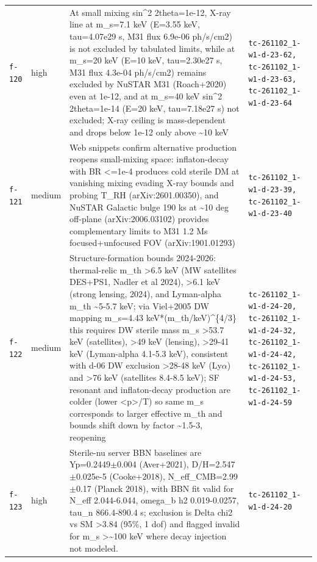 \documentclass[11pt,a4paper]{article}
\begin{document}
\begin{longtable}{@{}p{}p{}p{}p{}@{}}
\texttt{f-120} & high & At small mixing sin\textasciicircum{}2 2theta=1e-12, X-ray line at m\_s=7.1 keV (E=3.55 keV, tau=4.07e29 s, M31 flux 6.9e-06 ph/s/cm2) is not excluded by tabulated limits, while at m\_s=20 keV (E=10 keV, tau=2.30e27 s, M31 flux 4.3e-04 ph/s/cm2) remains excluded by NuSTAR M31 (Roach+2020) even at 1e-12, and at m\_s=40 keV sin\textasciicircum{}2 2theta=1e-14 (E=20 keV, tau=7.18e27 s) not excluded; X-ray ceiling is mass-dependent and drops below 1e-12 only above \textasciitilde{}10 keV & \texttt{tc-261102\_\allowbreak{}1-w1-d-23-62,\allowbreak{} tc-261102\_\allowbreak{}1-w1-d-23-63,\allowbreak{} tc-261102\_\allowbreak{}1-w1-d-23-64} \\
\texttt{f-121} & medium & Web snippets confirm alternative production reopens small-mixing space: inflaton-decay with BR \textless{}=1e-4 produces cold sterile DM at vanishing mixing evading X-ray bounds and probing T\_RH (arXiv:2601.00350), and NuSTAR Galactic bulge 190 ks at \textasciitilde{}10 deg off-plane (arXiv:2006.03102) provides complementary limits to M31 1.2 Ms focused+unfocused FOV (arXiv:1901.01293) & \texttt{tc-261102\_\allowbreak{}1-w1-d-23-39,\allowbreak{} tc-261102\_\allowbreak{}1-w1-d-23-40} \\
\texttt{f-122} & medium & Structure-formation bounds 2024-2026: thermal-relic m\_th \textgreater{}6.5 keV (MW satellites DES+PS1, Nadler et al 2024), \textgreater{}6.1 keV (strong lensing, 2024), and Lyman-alpha m\_th \textasciitilde{}5-5.7 keV; via Viel+2005 DW mapping m\_s=4.43 keV*(m\_th/keV)\textasciicircum{}\{4/3\} this requires DW sterile mass m\_s \textgreater{}53.7 keV (satellites), \textgreater{}49 keV (lensing), \textgreater{}29-41 keV (Lyman-alpha 4.1-5.3 keV), consistent with d-06 DW exclusion \textgreater{}28-48 keV (Ly$\alpha$) and \textgreater{}76 keV (satellites 8.4-8.5 keV); SF resonant and inflaton-decay production are colder (lower \textless{}p\textgreater{}/T) so same m\_s corresponds to larger effective m\_th and bounds shift down by factor \textasciitilde{}1.5-3, reopening & \texttt{tc-261102\_\allowbreak{}1-w1-d-24-20,\allowbreak{} tc-261102\_\allowbreak{}1-w1-d-24-32,\allowbreak{} tc-261102\_\allowbreak{}1-w1-d-24-42,\allowbreak{} tc-261102\_\allowbreak{}1-w1-d-24-53,\allowbreak{} tc-261102\_\allowbreak{}1-w1-d-24-59} \\
\texttt{f-123} & high & Sterile-nu server BBN baselines are Yp=0.2449$\pm$0.004 (Aver+2021), D/H=2.547$\pm$0.025e-5 (Cooke+2018), N\_eff\_CMB=2.99$\pm$0.17 (Planck 2018), with BBN fit valid for N\_eff 2.044-6.044, omega\_b h2 0.019-0.0257, tau\_n 866.4-890.4 s; exclusion is Delta chi2 vs SM \textgreater{}3.84 (95\%, 1 dof) and flagged invalid for m\_s \textgreater{}\textasciitilde{}100 keV where decay injection not modeled. & \texttt{tc-261102\_\allowbreak{}1-w1-d-24-20} \\

\end{longtable}
\end{document}
